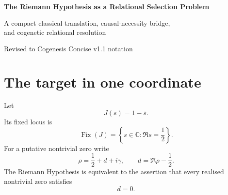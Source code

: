 \documentclass[11pt]{article}
\newcommand{\Fix}{\operatorname{Fix}}
\begin{document}
\begin{center}
{\LARGE\bfseries The Riemann Hypothesis as a Relational Selection Problem\par}
\vspace{0.42em}
{\large A compact classical translation, causal-necessity bridge,\\
and cogenetic relational resolution\par}
\vspace{0.9em}
{\small Revised to Cogenesis Concise v1.1 notation}
\end{center}

\vspace{0.65em}

\begin{abstract}
This note isolates the compact relational core of a cogenetic argument for the Riemann Hypothesis and states explicitly the only apparent point of contention with classical analysis. The statement \(F(x)=0\) is meaningful only after the codomain, equality relation, evaluation rule, and distinguished zero element are available. Classical analysis therefore already presupposes zero before it can identify a zero. Cogenesis does not add a new scalar fact at this point; it asks for the causal accounting by which a presently enacted expression resolves to that already-defined scalar result. Under causal necessity, a realised result must be carried by the resolution that makes it available. An off-line zero defines its own refinement record, keyed to the pole of the shifted reciprocal \(1/\zeta\) at the candidate, and a persistent M\"obius exponent obstruction witnesses at every finite refinement that this record branches; the record is the differential the resolution acts on. With the updated Cogenesis v1.1 typing, the Riemann branch has a unique persistence-qualified unary at displacement \(0\), while off-line displacements remain retained residuals. A claimed off-line zero therefore cannot also occupy the realised unary channel of the same enacted recovery.
\end{abstract}

\section{The target in one coordinate}

Let
\[
J(s)=1-\bar s.
\]
Its fixed locus is
\[
\Fix(J)=\left\{s\in\mathbb C:\Re s=\frac12\right\}.
\]
For a putative nontrivial zero write
\[
\rho=\frac12+d+i\gamma,
\qquad
d=\Re\rho-\frac12.
\]
The Riemann Hypothesis is equivalent to the assertion that every realised nontrivial zero satisfies
\[
d=0.
\]
\end{document}
